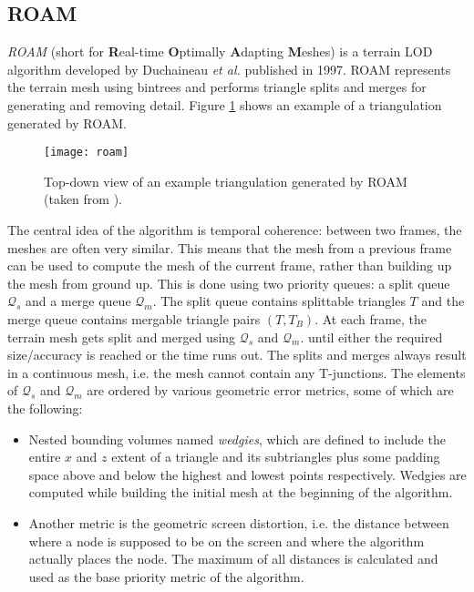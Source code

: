 \subsection{ROAM}
\textit{ROAM} (short for \textbf{R}eal-time \textbf{O}ptimally \textbf{A}dapting \textbf{M}eshes) 
is a terrain LOD algorithm developed by Duchaineau \textit{et al.} \cite{roam} published in 1997.
ROAM represents the terrain mesh using bintrees and performs triangle splits and merges
for generating and removing detail. Figure \ref{fig:roam} shows an example of 
a triangulation generated by ROAM.

\begin{figure}[H]
  \centering
  \texttt{[image: roam]}
  \caption{Top-down view of an example triangulation generated by ROAM (taken from \cite{roam}).}\label{fig:roam}
\end{figure}


The central idea of the algorithm is temporal coherence: between two frames, 
the meshes are often very similar. This means that the mesh from a previous frame can be used to compute 
the mesh of the current frame, rather than building up the mesh from ground up.
This is done using two priority queues: a split queue $\mathcal{Q}_s$ and a merge queue $\mathcal{Q}_m$.
The split queue contains splittable triangles $T$
and the merge queue contains mergable triangle pairs $(T,T_B)$.
At each frame, the terrain mesh gets split and merged using $\mathcal{Q}_s$ and $\mathcal{Q}_m$. until either the required size/accuracy is reached
or the time runs out. 
The splits and merges always result in a continuous mesh, i.e. the mesh cannot contain any 
T-junctions.
The elements of $\mathcal{Q}_s$ and $\mathcal{Q}_m$ are ordered by 
various geometric error metrics, some of which are the following:
\begin{itemize}
  \item Nested bounding volumes named \textit{wedgies}, which are defined to include the entire $x$ and $z$ extent of a triangle and its subtriangles 
        plus some padding space above and below the highest and lowest points respectively. Wedgies are computed while building the initial mesh at the beginning of the algorithm.
  \item Another metric is the geometric screen distortion, i.e. the distance between where a node is supposed to be on the screen and where the algorithm actually places the node.
        The maximum of all distances is calculated and used as the base priority metric of the algorithm.
\end{itemize}

